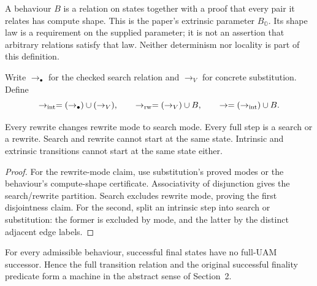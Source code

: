 \begin{definition}
A behaviour $B$ is a relation on states together with a proof that every pair
it relates has compute shape. This is the paper's extrinsic parameter
$B_{\mathbb O}$. Its shape law is a requirement on the supplied parameter;
it is not an assertion that arbitrary relations satisfy that law.
Neither determinism nor locality is part of this definition.
\end{definition}
\begin{definition}
Write $\to_\bullet$ for the checked search relation and $\to_V$ for concrete
substitution. Define
\[
 \to_{\rm int}=(\to_\bullet)\cup(\to_V),\qquad
 \to_{\rm rw}=(\to_V)\cup B,\qquad
 \to=(\to_{\rm int})\cup B.
\]
\end{definition}
\begin{proposition}
Every rewrite changes rewrite mode to search mode. Every full step is a search
or a rewrite. Search and rewrite cannot start at the same state. Intrinsic
and extrinsic transitions cannot start at the same state either.
\end{proposition}
\begin{proof}
For the rewrite-mode claim, use substitution's proved modes or the behaviour's
compute-shape certificate. Associativity of disjunction gives the search/rewrite
partition. Search excludes rewrite mode, proving the first disjointness claim.
For the second, split an intrinsic step into search or substitution: the former
is excluded by mode, and the latter by the distinct adjacent edge labels.
\end{proof}
\begin{theorem}
For every admissible behaviour, successful final states have no full-UAM
successor. Hence the full transition relation and the original successful
finality predicate form a machine in the abstract sense of Section~2.
\end{theorem}
